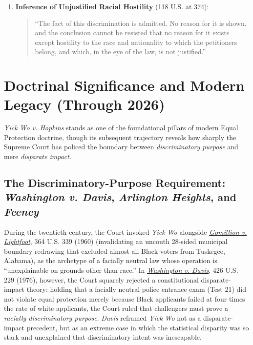 \documentclass[12pt]{article}
\begin{document}
\begin{enumerate}
    \item \textbf{Inference of Unjustified Racial Hostility} (\href{https://supreme.justia.com/cases/federal/us/118/356/}{118 U.S. at 374}):
    \begin{quote}
        ``The fact of this discrimination is admitted. No reason for it is shown, and the conclusion cannot be resisted that no reason for it exists except hostility to the race and nationality to which the petitioners belong, and which, in the eye of the law, is not justified.''
    \end{quote}
\end{enumerate}

\section{Doctrinal Significance and Modern Legacy (Through 2026)}

\emph{Yick Wo v. Hopkins} stands as one of the foundational pillars of modern Equal Protection doctrine, though its subsequent trajectory reveals how sharply the Supreme Court has policed the boundary between \emph{discriminatory purpose} and mere \emph{disparate impact}.

\subsection{The Discriminatory-Purpose Requirement: \emph{Washington v. Davis}, \emph{Arlington Heights}, and \emph{Feeney}}
During the twentieth century, the Court invoked \emph{Yick Wo} alongside \href{https://supreme.justia.com/cases/federal/us/364/339/}{\emph{Gomillion v. Lightfoot}}, 364 U.S. 339 (1960) (invalidating an uncouth 28-sided municipal boundary redrawing that excluded almost all Black voters from Tuskegee, Alabama), as the archetype of a facially neutral law whose operation is ``unexplainable on grounds other than race.'' In \href{https://supreme.justia.com/cases/federal/us/426/229/}{\emph{Washington v. Davis}}, 426 U.S. 229 (1976), however, the Court squarely rejected a constitutional disparate-impact theory: holding that a facially neutral police entrance exam (Test 21) did not violate equal protection merely because Black applicants failed at four times the rate of white applicants, the Court ruled that challengers must prove a \emph{racially discriminatory purpose}. \emph{Davis} reframed \emph{Yick Wo} not as a disparate-impact precedent, but as an extreme case in which the statistical disparity was so stark and unexplained that discriminatory intent was inescapable.
\end{document}
